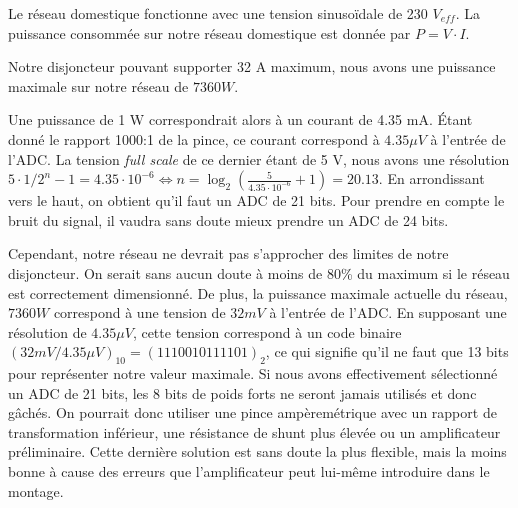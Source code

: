 \documentclass{../../template/tp}
\begin{document}
{
	Le réseau domestique fonctionne avec une tension sinusoïdale de 230 $V_{eff}$.
	La puissance consommée sur notre réseau domestique est donnée par $P = V \cdot I$.

	Notre disjoncteur pouvant supporter 32 A maximum, nous avons une puissance maximale sur notre réseau de $7360 W$.

	Une puissance de 1 W correspondrait alors à un courant de 4.35 mA. Étant donné le rapport 1000:1 de la pince, ce courant correspond à $4.35\mu V$ à l'entrée de l'ADC.
	La tension \textit{full scale} de ce dernier étant de 5 V, nous avons une résolution $5 \cdot 1/2^n-1 = 4.35 \cdot 10^{-6} \Leftrightarrow  n = \log_2(\frac{5}{4.35 \cdot 10^{-6}}+1) = 20.13$. En arrondissant vers le haut, on obtient qu'il faut un ADC de 21 bits. Pour prendre en compte le bruit du signal, il vaudra sans doute mieux prendre un ADC de 24 bits.

	Cependant, notre réseau ne devrait pas s'approcher des limites de notre disjoncteur. On serait sans aucun doute à moins de 80\% du maximum si le réseau est correctement dimensionné.
	De plus, la puissance maximale actuelle du réseau, $7360 W$ correspond à une tension de $32 mV$ à l'entrée de l'ADC. En supposant une résolution de $4.35\mu V$, cette tension correspond à un code binaire $(32 mV/4.35\mu V)_{10} = (1110010111101)_2$, ce qui signifie qu'il ne faut que 13 bits pour représenter notre valeur maximale. Si nous avons effectivement sélectionné un ADC de 21 bits, les 8 bits de poids forts ne seront jamais utilisés et donc gâchés.
	On pourrait donc utiliser une pince ampèremétrique avec un rapport de transformation inférieur, une résistance de shunt plus élevée ou un amplificateur préliminaire. Cette dernière solution est sans doute la plus flexible, mais la moins bonne à cause des erreurs que l'amplificateur peut lui-même introduire dans le montage.
}
\end{document}
